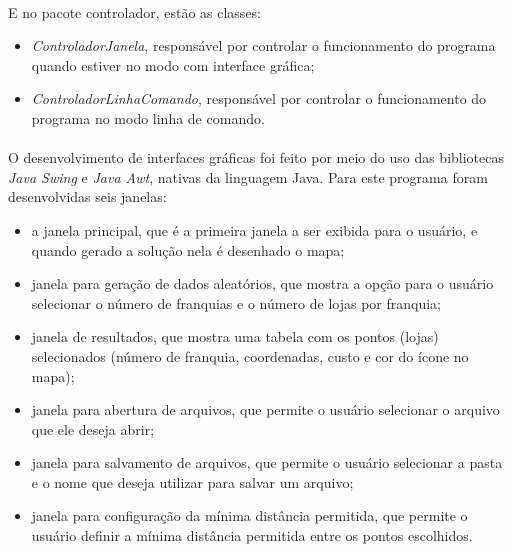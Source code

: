 \documentclass[12pt]{article}
\begin{document}
\paragraph{}E no pacote controlador, estão as classes:

\begin{itemize}
    \item \textit{ControladorJanela}, responsável por controlar o funcionamento do programa quando estiver no modo com interface gráfica;
    \item \textit{ControladorLinhaComando}, responsável por controlar o funcionamento do programa no modo linha de comando.
\end{itemize}

\paragraph{}O desenvolvimento de interfaces gráficas foi feito por meio do uso das bibliotecas \textit{Java Swing} e \textit{Java Awt}, nativas da linguagem Java. Para este programa foram desenvolvidas seis janelas:

\begin{itemize}
    \item a janela principal, que é a primeira janela a ser exibida para o usuário, e quando gerado a solução nela é desenhado o mapa;
    \item janela para geração de dados aleatórios, que mostra a opção para o usuário selecionar o número de franquias e o número de lojas por franquia;
    \item janela de resultados, que mostra uma tabela com os pontos (lojas) selecionados (número de franquia, coordenadas, custo e cor do ícone no mapa);
    \item janela para abertura de arquivos, que permite o usuário selecionar o arquivo que ele deseja abrir;
    \item janela para salvamento de arquivos, que permite o usuário selecionar a pasta e o nome que deseja utilizar para salvar um arquivo;
    \item janela para configuração da mínima distância permitida, que permite o usuário definir a mínima distância permitida entre os pontos escolhidos.
\end{itemize}
\end{document}
